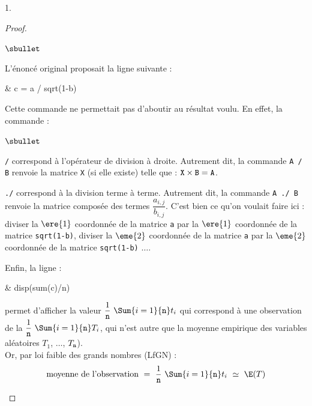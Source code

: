\documentclass[11pt]{article}%
\begin{document}
\begin{noliste}{1.}
\begin{proof}
\begin{noliste}{$\sbullet$}
      
      \begin{remark}
        L'énoncé original proposait la ligne  suivante :\\[-.3cm]
        \begin{scilabC}{3}
          & c = a / sqrt(1-b)
        \end{scilabC}
        Cette commande ne permettait pas d'aboutir au résultat
        voulu. En effet, la commande :
        \begin{noliste}{$\sbullet$}
        \item {\tt /} correspond à l'opérateur de division à
          droite. Autrement dit, la commande {\tt A / B} renvoie la
          matrice {\tt X} (si elle existe) telle que : ${\tt X} \times
          {\tt B} = {\tt A}$.
          
        \item {\tt ./} correspond à la division terme à
          terme. Autrement dit, la commande {\tt A ./ B} renvoie la
          matrice composée des termes $\dfrac{a_{i,j}}{b_{i,j}}$.
          C'est bien ce qu'on voulait faire ici : diviser la $\ere{1}$
          coordonnée de la matrice {\tt a} par la $\ere{1}$ coordonnée
          de la matrice {\tt sqrt(1-b)}, diviser la $\eme{2}$
          coordonnée de la matrice {\tt a} par la $\eme{2}$ coordonnée
          de la matrice {\tt sqrt(1-b)} $\ldots$.
        \end{noliste}
      \end{remark}
      
    \item Enfin, la ligne  :
      \begin{scilabC}{4}
        & disp(sum(c)/n)
      \end{scilabC}
      permet d'afficher la valeur $\dfrac{1}{{\tt n}} \ \Sum{i=1}{{\tt
          n}} t_i$ qui correspond à une observation de la \var
      $\dfrac{1}{{\tt n}} \ \Sum{i=1}{{\tt n}} T_i$, qui n'est autre
      que la moyenne empirique des variables aléatoires $T_1$,
      $\ldots$, $T_{\tt n}$).\\[.2cm]
      Or, par loi faible des grands nombres (LfGN) :
      \[
      \text{moyenne de l'observation} \ = \ \dfrac{1}{{\tt n}} \
      \Sum{i=1}{{\tt n}} t_i \ \simeq \ \E(T)
      \]
      
          

\end{noliste}
\end{proof}
\end{noliste}
\end{document}
